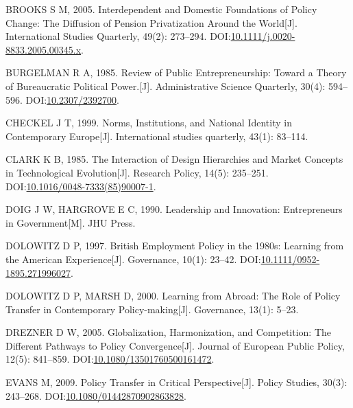 \documentclass[
  12pt,
]{ctexart}
\newlength{\cslhangindent}
\newlength{\cslentryspacingunit} %
\newenvironment{CSLReferences}[2] %
 {%
  \setlength{\parindent}{0pt}
  \ifodd #1
  \let\oldpar\par
  \def\par{\hangindent=\cslhangindent\oldpar}
  \fi
  \setlength{\parskip}{#2\cslentryspacingunit}
 }%
 {}
\begin{document}
\begin{CSLReferences}{1}{0}
\leavevmode{}%
BROOKS S M, 2005. Interdependent and {Domestic Foundations} of {Policy Change}: {The Diffusion} of {Pension Privatization Around} the {World}{[}J{]}. International Studies Quarterly, 49(2): 273--294. DOI:\href{https://doi.org/10.1111/j.0020-8833.2005.00345.x}{10.1111/j.0020-8833.2005.00345.x}.

\leavevmode{}%
BURGELMAN R A, 1985. Review of {Public Entrepreneurship}: {Toward} a {Theory} of {Bureaucratic Political Power}.{[}J{]}. Administrative Science Quarterly, 30(4): 594--596. DOI:\href{https://doi.org/10.2307/2392700}{10.2307/2392700}.

\leavevmode{}%
CHECKEL J T, 1999. Norms, Institutions, and National Identity in Contemporary {Europe}{[}J{]}. International studies quarterly, 43(1): 83--114.

\leavevmode{}%
CLARK K B, 1985. The Interaction of Design Hierarchies and Market Concepts in Technological Evolution{[}J{]}. Research Policy, 14(5): 235--251. DOI:\href{https://doi.org/10.1016/0048-7333(85)90007-1}{10.1016/0048-7333(85)90007-1}.

\leavevmode{}%
DOIG J W, HARGROVE E C, 1990. Leadership and Innovation: {Entrepreneurs} in Government{[}M{]}. {JHU Press}.

\leavevmode{}%
DOLOWITZ D P, 1997. British {Employment Policy} in the 1980s: {Learning} from the {American Experience}{[}J{]}. Governance, 10(1): 23--42. DOI:\href{https://doi.org/10.1111/0952-1895.271996027}{10.1111/0952-1895.271996027}.

\leavevmode{}%
DOLOWITZ D P, MARSH D, 2000. Learning from Abroad: {The} Role of Policy Transfer in Contemporary Policy-making{[}J{]}. Governance, 13(1): 5--23.

\leavevmode{}%
DREZNER D W, 2005. Globalization, Harmonization, and Competition: The Different Pathways to Policy Convergence{[}J{]}. Journal of European Public Policy, 12(5): 841--859. DOI:\href{https://doi.org/10.1080/13501760500161472}{10.1080/13501760500161472}.

\leavevmode{}%
EVANS M, 2009. Policy Transfer in Critical Perspective{[}J{]}. Policy Studies, 30(3): 243--268. DOI:\href{https://doi.org/10.1080/01442870902863828}{10.1080/01442870902863828}.


\end{CSLReferences}
\end{document}
